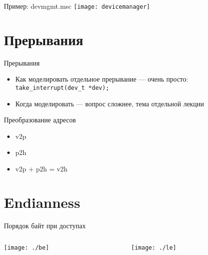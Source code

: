 \begin{frame}{Пример: devmgmt.msc}
\centering
\texttt{[image: devicemanager]}
\end{frame}

\section{Прерывания}

\begin{frame}{Прерывания}
\begin{centering}
\end{centering}

\begin{itemize}
\item Как моделировать отдельное прерывание — очень просто:\\
\texttt{take_interrupt(dev_t *dev);}
\item Когда моделировать — вопрос сложнее, тема отдельной лекции
\end{itemize}

\end{frame}

\begin{frame}{Преобразование адресов}
\begin{itemize}
\item v2p
\item p2h
\item v2p + p2h =  v2h
\end{itemize}
\end{frame}

\section{Endianness}

\begin{frame}{Порядок байт при доступах}

\begin{columns}[onlytextwidth]
\begin{column}{0.5\textwidth}
\texttt{[image: ./be]}
\end{column}

\begin{column}{0.5\textwidth}
\texttt{[image: ./le]}
\end{column}
\end{columns}




\end{frame}


